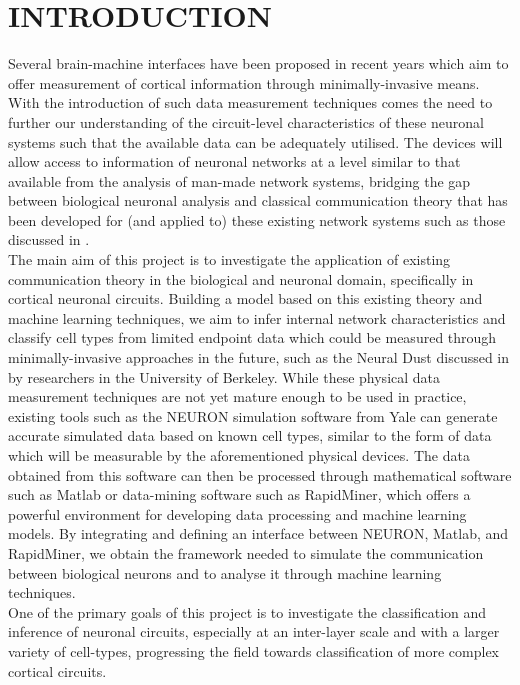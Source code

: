 \documentclass[letterpaper, 10 pt, conference]{ieeeconf}  %
\begin{document}
\section{INTRODUCTION}
Several brain-machine interfaces have been proposed in recent years which aim to offer measurement of cortical information through minimally-invasive means. With the introduction of such data measurement techniques comes the need to further our understanding of the circuit-level characteristics of these neuronal systems such that the available data can be adequately utilised. The devices will allow access to information of neuronal networks at a level similar to that available from the analysis of man-made network systems, bridging the gap between biological neuronal analysis and classical communication theory that has been developed for (and applied to) these existing network systems such as those discussed in \cite{mBarrosMolCom}.\\
The main aim of this project is to investigate the application of existing communication theory in the biological and neuronal domain, specifically in cortical neuronal circuits. Building a model based on this existing theory and machine learning techniques, we aim to infer internal network characteristics and classify cell types from limited endpoint data which could be measured through minimally-invasive approaches in the future, such as the Neural Dust discussed in \cite{NeurDust} by researchers in the University of Berkeley. While these physical data measurement techniques are not yet mature enough to be used in practice, existing tools such as the NEURON simulation software from Yale can generate accurate simulated data based on known cell types, similar to the form of data which will be measurable by the aforementioned physical devices. The data obtained from this software can then be processed through mathematical software such as Matlab or data-mining software such as RapidMiner, which offers a powerful environment for developing data processing and machine learning models. By integrating and defining an interface between NEURON, Matlab, and RapidMiner, we obtain the framework needed to simulate the communication between biological neurons and to analyse it through machine learning techniques.\\
One of the primary goals of this project is to investigate the classification and inference of neuronal circuits, especially at an inter-layer scale and with a larger variety of cell-types, progressing the field towards classification of more complex cortical circuits.\\
\end{document}
